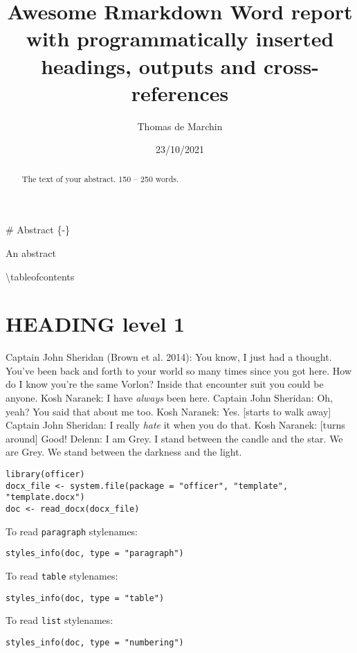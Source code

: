 \documentclass[
  10pt,
  twoside]{article}
\title{Awesome Rmarkdown Word report with programmatically inserted headings, outputs and cross-references}
\author{Thomas de Marchin}
\date{23/10/2021}
\begin{document}
\maketitle
\begin{abstract}
The text of your abstract. 150 -- 250 words.
\end{abstract}

{
\setcounter{tocdepth}{3}
\tableofcontents
}
\# Abstract \{-\}

An abstract

\textbackslash tableofcontents

\hypertarget{heading-level-1}{%
\section{HEADING level 1}\label{heading-level-1}}

Captain John Sheridan (Brown et al. 2014): You know, I just had a thought. You've been back and forth to your world so many times since you got here. How do I know you're the same Vorlon? Inside that encounter suit you could be anyone. Kosh Naranek: I have \emph{always} been here. Captain John Sheridan: Oh, yeah? You said that about me too. Kosh Naranek: Yes. {[}starts to walk away{]} Captain John Sheridan: I really \emph{hate} it when you do that. Kosh Naranek: {[}turns around{]} Good! Delenn: I am Grey. I stand between the candle and the star. We are Grey. We stand between the darkness and the light.

\begin{verbatim}
library(officer)
docx_file <- system.file(package = "officer", "template", "template.docx")
doc <- read_docx(docx_file)
\end{verbatim}

To read \texttt{paragraph} stylenames:

\begin{verbatim}
styles_info(doc, type = "paragraph")
\end{verbatim}

To read \texttt{table} stylenames:

\begin{verbatim}
styles_info(doc, type = "table")
\end{verbatim}

To read \texttt{list} stylenames:

\begin{verbatim}
styles_info(doc, type = "numbering")
\end{verbatim}
\end{document}

